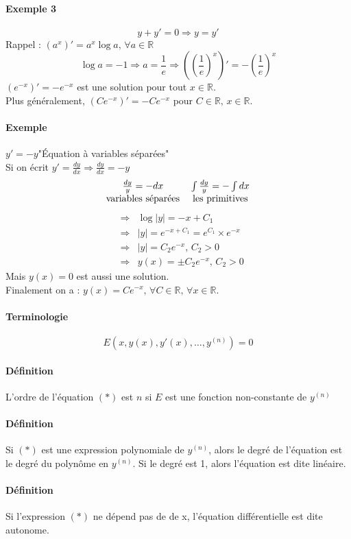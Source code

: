 \documentclass[1Opt]{report}
\begin{document}
\paragraph{Exemple 3}
\[y+y'=0\Rightarrow y=y'\]
Rappel : $(a^x)'=a^x\log{a}, \, \forall a\in{\mathbb R}$
\[\log{a}=-1\Rightarrow a=\frac{1}{e}\Rightarrow \left(\left(\frac{1}{e}\right)^x\right)'=-\left(\frac{1}{e}\right)^x\]
$(e^{-x})'=-e^{-x}$ est une solution pour tout $x\in{\mathbb R}$.\\
Plus généralement, $(Ce^{-x})'=-Ce^{-x}$ pour $C\in{\mathbb R},\,x\in{\mathbb R}$.

\paragraph{Exemple}
$y'=-y$\quad "Équation à variables séparées" \\
Si on écrit $y'=\frac{dy}{dx}\Rightarrow\frac{dy}{dx}=-y$
\begin{eqnarray*}
  \begin{tabular}{c c}
    $\frac{dy}{y}=-dx$ & $\int{\frac{dy}{y}}=-\int{dx}$ \\
    variables séparées & les primitives
  \end{tabular}
\end{eqnarray*}
\begin{eqnarray*}
  & \Rightarrow & \log{|y|}=-x+C_1 \\
  & \Rightarrow & |y|=e^{-x+C_1}=e^{C_1}\times e^{-x}\\
  & \Rightarrow & |y|=C_2e^{-x},\, C_2>0\\
  & \Rightarrow & y(x)=\pm C_2e^{-x},\, C_2>0
\end{eqnarray*}
Mais $y(x)=0$ est aussi une solution.\\
Finalement on a : $y(x)=Ce^{-x},\,\forall C\in{\mathbb R},\,\forall x\in{\mathbb R}$.

\paragraph{Terminologie}
\begin{equation*}
  E\left(x,y(x),y'(x),\ldots,y^{(n)}\right)=0 \tag{$\ast$}
\end{equation*}

\paragraph{Définition}
L'ordre de l'équation $(\ast)$ est $n$ si $E$ est une fonction non-constante
de $y^{(n)}$

\paragraph{Définition}
Si $(\ast)$ est une expression polynomiale de $y^{(n)}$, alors le degré de
l'équation est le degré du polynôme en $y^{(n)}$. Si le degré est 1, alors
l'équation est dite linéaire.

\paragraph{Définition}
Si l'expression $(\ast)$ ne dépend pas de de x, l'équation différentielle est
dite autonome.
\end{document}
